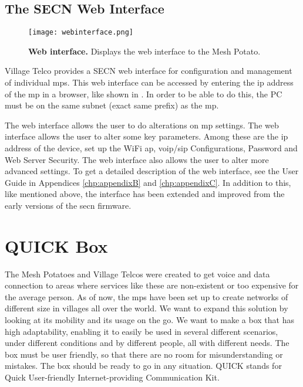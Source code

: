 \subsection{The SECN Web Interface}
\label{subsec:interface}

\begin{figure}[t]
  \centering
      \texttt{[image: webinterface.png]}
  \caption [Web interface]{\textbf{Web interface.} Displays the web interface to the Mesh Potato.}
  \label{fig:webinterface}
\end{figure}

Village Telco provides a SECN web interface for configuration and management of individual \glspl{mp}. This web interface can be accessed by entering the \gls{ip} address of the \gls{mp} in a browser, like shown in . In order to be able to do this, the PC must be on the same subnet (exact same prefix) as the \gls{mp}.  

The web interface allows the user to do alterations on \gls{mp} settings. The web interface allows the user to alter some key parameters. Among these are the \gls{ip} address of the device, set up the WiFi \gls{ap}, \gls{voip}/\gls{sip} Configurations, Password and Web Server Security. The web interface also allows the user to alter more advanced settings. To get a detailed description of the web interface, see the User Guide in Appendices \ref{chp:appendixB} and \ref{chp:appendixC}. In addition to this, like mentioned above, the interface has been extended and improved from the early versions of the \gls{secn} firmware. 



\section{QUICK Box}
The Mesh Potatoes and Village Telcos were created to get voice and data connection to areas where services like these are non-existent or too expensive for the average person. As of now, the \glspl{mp} have been set up to create networks of different size in villages all over the world. We want to expand this solution by looking at its mobility and its usage on the go. We want to make a box that has high adaptability, enabling it to easily be used in several different scenarios, under different conditions and by different people, all with different needs. The box must be user friendly, so that there are no room for misunderstanding or mistakes. The box should be ready to go in any situation. QUICK stands for Quick User-friendly Internet-providing Communication Kit. 

